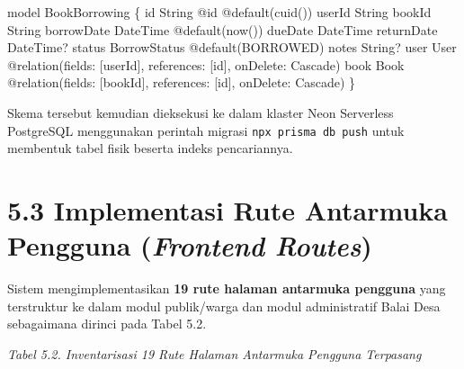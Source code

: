 \documentclass[
  indonesian,
  12pt,
]{report}
\newenvironment{Shaded}{}{}
\newcommand{\NormalTok}[1]{#1}
\begin{document}
\begin{Shaded}
\begin{Highlighting}[]
\NormalTok{model BookBorrowing \{}
\NormalTok{  id          String        @id @default(cuid())}
\NormalTok{  userId      String}
\NormalTok{  bookId      String}
\NormalTok{  borrowDate  DateTime      @default(now())}
\NormalTok{  dueDate     DateTime}
\NormalTok{  returnDate  DateTime?}
\NormalTok{  status      BorrowStatus  @default(BORROWED)}
\NormalTok{  notes       String?}
\NormalTok{  user        User          @relation(fields: [userId], references: [id], onDelete: Cascade)}
\NormalTok{  book        Book          @relation(fields: [bookId], references: [id], onDelete: Cascade)}
\NormalTok{\}}
\end{Highlighting}
\end{Shaded}

Skema tersebut kemudian dieksekusi ke dalam klaster Neon Serverless
PostgreSQL menggunakan perintah migrasi \texttt{npx\ prisma\ db\ push}
untuk membentuk tabel fisik beserta indeks pencariannya.

\section{\texorpdfstring{5.3 Implementasi Rute Antarmuka Pengguna
(\emph{Frontend
Routes})}{5.3 Implementasi Rute Antarmuka Pengguna (Frontend Routes)}}\label{implementasi-rute-antarmuka-pengguna-frontend-routes}

Sistem mengimplementasikan \textbf{19 rute halaman antarmuka pengguna}
yang terstruktur ke dalam modul publik/warga dan modul administratif
Balai Desa sebagaimana dirinci pada Tabel 5.2.

\emph{Tabel 5.2. Inventarisasi 19 Rute Halaman Antarmuka Pengguna
Terpasang}
\end{document}

